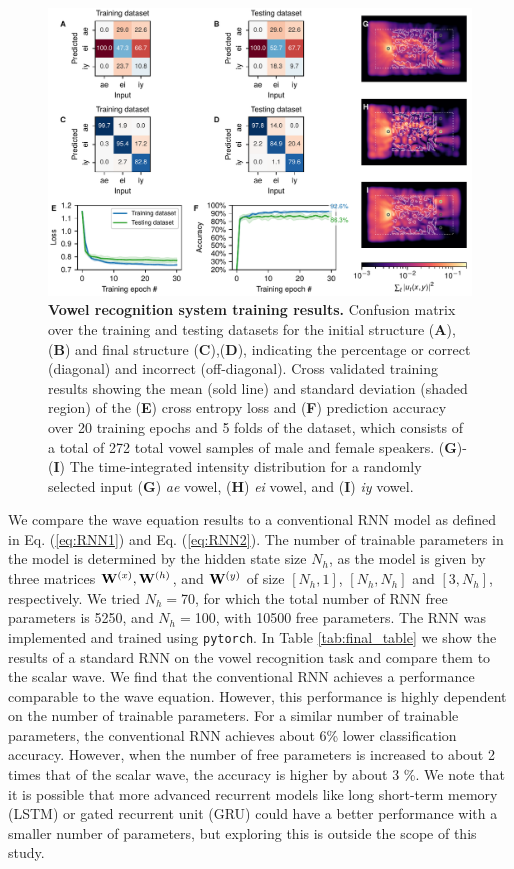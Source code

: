 \begin{figure}
  \centering
  \includegraphics[width=\textwidth]{figures/insitu_RNN_results}
  \caption{\textbf{Vowel recognition system training results.}
  Confusion matrix over the training and testing datasets for the initial structure (\textbf{A}),(\textbf{B}) and final structure (\textbf{C}),(\textbf{D}), indicating the percentage or correct (diagonal) and incorrect (off-diagonal). 
  Cross validated training results showing the mean (sold line) and standard deviation (shaded region) of the (\textbf{E}) cross entropy loss and (\textbf{F}) prediction accuracy over 20 training epochs and 5 folds of the dataset, which consists of a total of 272 total vowel samples of male and female speakers.
  (\textbf{G})-(\textbf{I}) The time-integrated intensity distribution for a randomly selected input (\textbf{G}) \textit{ae} vowel, (\textbf{H}) \textit{ei} vowel, and (\textbf{I}) \textit{iy} vowel.}
  \label{fig:results}
\end{figure}

We compare the wave equation results to a conventional RNN model as defined in Eq. (\ref{eq:RNN1}) and Eq. (\ref{eq:RNN2}). 
The number of trainable parameters in the model is determined by the hidden state size $N_h$, as the model is given by three matrices $\mathbf{W}^{(x)}, \mathbf{W}^{(h)}$, and $\mathbf{W}^{(y)}$ of size $[N_h, 1]$, $[N_h, N_h]$ and $[3, N_h]$, respectively. 
We tried $N_h = $70, for which the total number of RNN free parameters is 5250, and $N_h=$100, with 10500 free parameters. 
The RNN was implemented and trained using \texttt{pytorch}.  
In Table \ref{tab:final_table} we show the results of a standard RNN on the vowel recognition task and compare them to the scalar wave.  
We find that the conventional RNN achieves a performance comparable to the wave equation.
However, this performance is highly dependent on the number of trainable parameters.  
For a similar number of trainable parameters, the conventional RNN achieves about 6\% lower classification accuracy.  
However, when the number of free parameters is increased to about 2 times that of the scalar wave, the accuracy is higher by about 3 \%. 
We note that it is possible that more advanced recurrent models like long short-term memory (LSTM) \cite{hochreiter1997long} or gated recurrent unit (GRU) \cite{chung2014empirical} could have a better performance with a smaller number of parameters, but exploring this is outside the scope of this study. 

